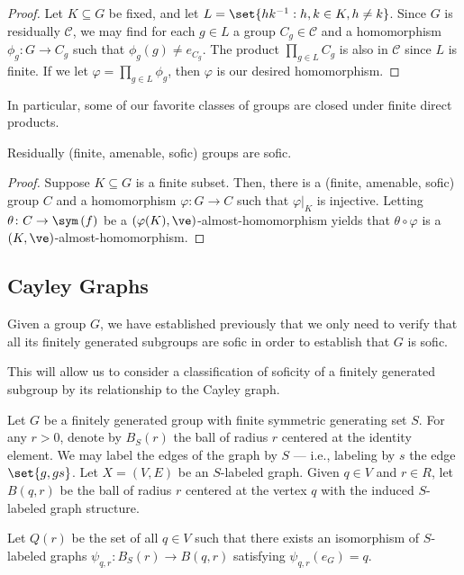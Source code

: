 \documentclass[10pt]{mypackage}
\begin{document}
\begin{proof}
  Let $K\subseteq G$ be fixed, and let $L = \set{hk^{-1} : h,k\in K,h\neq k}$. Since $G$ is residually $\mathcal{C}$, we may find for each $g\in L$ a group $C_g\in \mathcal{C}$ and a homomorphism $\phi_g\colon G\to C_g$ such that $\phi_g(g)\neq e_{C_g}$. The product $\prod_{g\in L}C_g$ is also in $\mathcal{C}$ since $L$ is finite. If we let $\varphi=\prod_{g\in L}\phi_g$, then $\varphi$ is our desired homomorphism.
\end{proof}
In particular, some of our favorite classes of groups are closed under finite direct products.
\begin{proposition}
  Residually (finite, amenable, sofic) groups are sofic.
\end{proposition}
\begin{proof}
  Suppose $K\subseteq G$ is a finite subset. Then, there is a (finite, amenable, sofic) group $C$ and a homomorphism $\varphi\colon G\to C$ such that $\varphi|_{K}$ is injective. Letting $\theta\colon C\to \sym\left( f \right)$ be a $\left( \varphi(K),\ve \right)$-almost-homomorphism yields that $\theta\circ\varphi$ is a $\left( K,\ve \right)$-almost-homomorphism.
\end{proof}

\subsection{Cayley Graphs}%
Given a group $G$, we have established previously that we only need to verify that all its finitely generated subgroups are sofic in order to establish that $G$ is sofic.

This will allow us to consider a classification of soficity of a finitely generated subgroup by its relationship to the Cayley graph.

Let $G$ be a finitely generated group with finite symmetric generating set $S$. For any $r > 0$, denote by $B_S(r)$ the ball of radius $r$ centered at the identity element. We may label the edges of the graph by $S$ --- i.e., labeling by $s$ the edge $\set{g,gs}$. Let $X = \left( V,E \right)$ be an $S$-labeled graph. Given $q\in V$ and $r\in R$, let $B\left( q,r \right)$ be the ball of radius $r$ centered at the vertex $q$ with the induced $S$-labeled graph structure.

Let $Q(r)$ be the set of all $q\in V$ such that there exists an isomorphism of $S$-labeled graphs $\psi_{q,r}\colon B_S(r)\rightarrow B\left( q,r \right)$ satisfying $\psi_{q,r}\left(e_G\right) = q$.
\end{document}
